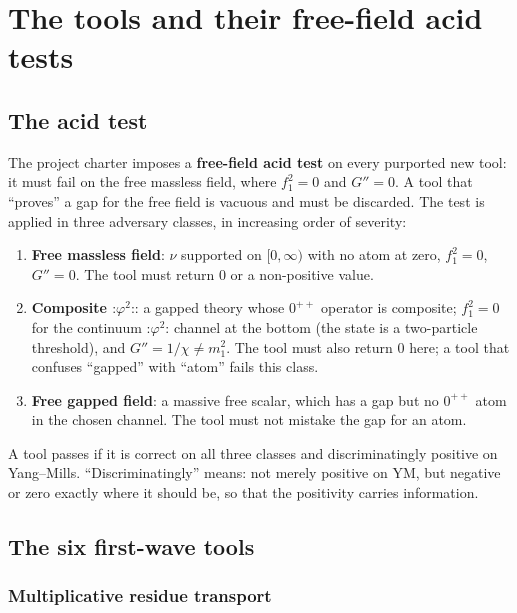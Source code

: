 \section{The tools and their free-field acid tests}

\figfredholm
\label{ch:tools}

\subsection{The acid test}

The project charter imposes a \textbf{free-field acid test} on every purported new tool: it must
fail on the free massless field, where $f_1^2=0$ and $G''=0$. A tool that ``proves'' a gap for
the free field is vacuous and must be discarded. The test is applied in three adversary classes,
in increasing order of severity:
\begin{enumerate}
\item \textbf{Free massless field}: $\nu$ supported on $[0,\infty)$ with no atom at zero,
  $f_1^2=0$, $G''=0$. The tool must return $0$ or a non-positive value.
\item \textbf{Composite $\mathord{:}\varphi^2\mathord{:}$}: a gapped theory whose $0^{++}$
  operator is composite; $f_1^2=0$ for the continuum $\mathord{:}\varphi^2\mathord{:}$ channel at
  the bottom (the state is a two-particle threshold), and $G''=1/\chi\ne m_1^2$. The tool must
  also return $0$ here; a tool that confuses ``gapped'' with ``atom'' fails this class.
\item \textbf{Free gapped field}: a massive free scalar, which has a gap but no $0^{++}$ atom in
  the chosen channel. The tool must not mistake the gap for an atom.
\end{enumerate}
A tool passes if it is correct on all three classes and discriminatingly positive on
Yang--Mills. ``Discriminatingly'' means: not merely positive on YM, but negative or zero exactly
where it should be, so that the positivity carries information.

\subsection{The six first-wave tools}
\label{sec:sixtools}

\subsubsection{Multiplicative residue transport}

